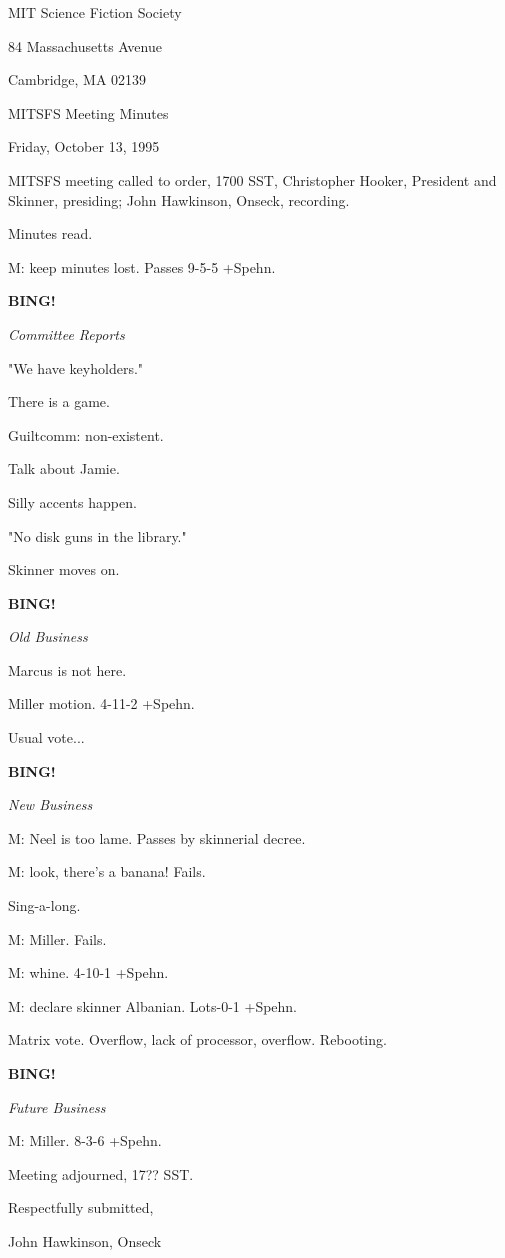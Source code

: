 \documentclass[12pt]{article}
\newcommand{\bing}{{\bf BING!} }
\newcommand{\goto}[1]{\bing \vskip 12pt \centerline{{\em{#1}}}}
\begin{document}
\begin{center}

MIT Science Fiction Society 

84 Massachusetts Avenue

Cambridge, MA 02139

\vspace{12pt}

MITSFS Meeting Minutes 

Friday, October 13, 1995

\end{center}
 
\vspace{18pt}

\setlength{\parskip}{6pt}

\noindent
MITSFS meeting called to order, 1700 SST,
Christopher Hooker, President and Skinner, presiding; John Hawkinson, Onseck, recording.

Minutes read.

M: keep minutes lost. Passes 9-5-5 +Spehn.

\goto{Committee Reports}

"We have keyholders."

There is a game.

Guiltcomm: non-existent.

Talk about Jamie.

Silly accents happen.

"No disk guns in the library."

Skinner moves on.

\goto{Old Business}

Marcus is not here.

Miller motion. 4-11-2 +Spehn.

Usual vote...

\goto{New Business}

M: Neel is too lame. Passes by skinnerial decree.

M: look, there's a banana! Fails.

Sing-a-long.

M: Miller. Fails.

M: whine. 4-10-1 +Spehn.

M: declare skinner Albanian. Lots-0-1 +Spehn.

Matrix vote. Overflow, lack of processor, overflow. Rebooting.

\goto{Future Business}

M: Miller. 8-3-6 +Spehn.

\vspace{12pt}

\noindent
Meeting adjourned, 17?? SST.

\vspace{18pt}

\centerline{Respectfully submitted,}
\centerline{John Hawkinson, Onseck}
\end{document}
